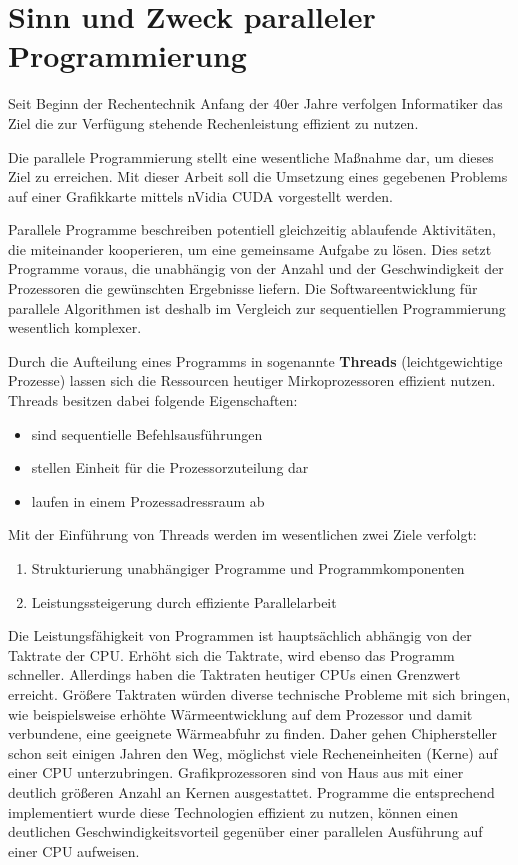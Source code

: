 
\chapter{Sinn und Zweck paralleler Programmierung}
\label{intro}
Seit Beginn der Rechentechnik Anfang der 40er Jahre verfolgen Informatiker das Ziel die zur Verfügung stehende Rechenleistung effizient zu nutzen.

Die parallele Programmierung stellt eine wesentliche Maßnahme dar, um dieses Ziel zu erreichen. Mit dieser Arbeit  soll die Umsetzung eines gegebenen Problems auf einer Grafikkarte mittels nVidia CUDA vorgestellt werden.

Parallele Programme beschreiben potentiell gleichzeitig ablaufende Aktivitäten, die miteinander kooperieren, um eine gemeinsame Aufgabe zu lösen. Dies setzt Programme voraus, die unabhängig von der Anzahl und der Geschwindigkeit der Prozessoren die gewünschten Ergebnisse liefern. Die Softwareentwicklung für parallele Algorithmen ist deshalb im Vergleich zur sequentiellen Programmierung wesentlich komplexer.

Durch die Aufteilung eines Programms in sogenannte \textbf{Threads} (\glqq leichtgewichtige Prozesse\grqq) lassen sich die Ressourcen heutiger Mirkoprozessoren effizient nutzen.
Threads besitzen dabei folgende Eigenschaften:
\begin{itemize}
\item sind sequentielle Befehlsausführungen
\item stellen Einheit für die Prozessorzuteilung dar
\item laufen in einem Prozessadressraum ab
\end{itemize}
Mit der Einführung von Threads werden im wesentlichen zwei Ziele verfolgt:
\begin{enumerate}
\item Strukturierung unabhängiger Programme und Programmkomponenten
\item Leistungssteigerung durch effiziente Parallelarbeit
\end{enumerate}

Die Leistungsfähigkeit von Programmen ist hauptsächlich abhängig von der Taktrate der CPU. Erhöht sich die Taktrate, wird ebenso das Programm schneller.
Allerdings haben die Taktraten heutiger CPUs einen Grenzwert erreicht.
Größere Taktraten würden diverse technische Probleme mit sich bringen, wie beispielsweise erhöhte Wärmeentwicklung auf dem Prozessor und damit verbundene, eine geeignete Wärmeabfuhr zu finden.
Daher gehen Chiphersteller schon seit einigen Jahren den Weg, möglichst viele Recheneinheiten (Kerne) auf einer CPU unterzubringen. Grafikprozessoren sind von Haus aus mit einer deutlich größeren Anzahl an Kernen ausgestattet.
Programme die entsprechend implementiert wurde diese Technologien effizient zu nutzen, können einen deutlichen Geschwindigkeitsvorteil gegenüber einer parallelen Ausführung auf einer CPU aufweisen.


